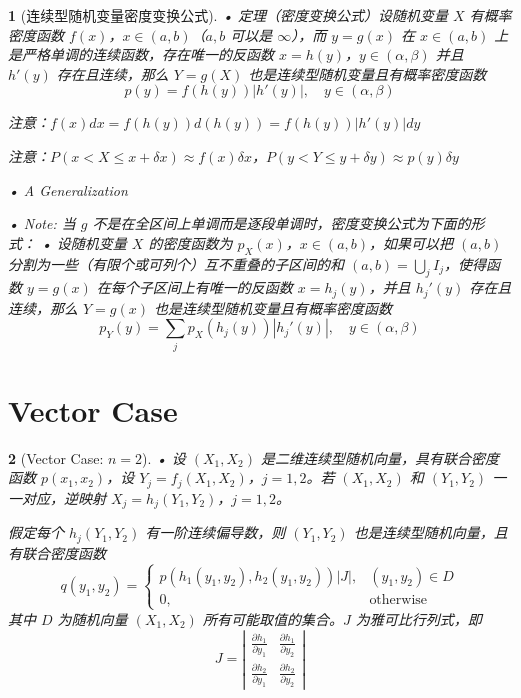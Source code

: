 \documentclass[UTF8]{report}
\theoremstyle{MyLineTheoremStyle} %
\theoremstyle{MyBlockTheoremStyle} %
\theoremstyle{MySubsubsectionStyle} %
\newtheorem{definition}{}
\begin{document}
\begin{definition}[连续型随机变量密度变换公式]
    • 定理（密度变换公式）设随机变量 $X$ 有概率密度函数 $f(x)$，$x \in (a,b)$（$a,b$ 可以是 $\infty$），而 $y=g(x)$ 在 $x \in (a,b)$ 上是严格单调的连续函数，存在唯一的反函数 $x=h(y)$，$y \in (\alpha,\beta)$ 并且 $h'(y)$ 存在且连续，那么 $Y=g(X)$ 也是连续型随机变量且有概率密度函数
    \[
    p(y) = f(h(y)) \left|h'(y)\right| , \quad y \in (\alpha, \beta)
    \]\par
    注意：$f(x)dx = f(h(y))d(h(y)) = f(h(y))\left|h'(y)\right|dy$
    \par
    注意：$P(x < X \leq x+\delta x) \approx f(x) \delta x$，$P(y < Y \leq y+\delta y) \approx p(y) \delta y$\par
    • A Generalization\par
    • Note: 当 $g$ 不是在全区间上单调而是逐段单调时，密度变换公式为下面的形式：
    • 设随机变量 $X$ 的密度函数为 $p_X(x)$，$x \in (a,b)$，如果可以把 $(a,b)$ 分割为一些（有限个或可列个）互不重叠的子区间的和 $(a,b)=\bigcup_j I_j$，使得函数 $y = g(x)$ 在每个子区间上有唯一的反函数 $x = h_j(y)$，并且 $h_j'(y)$ 存在且连续，那么 $Y = g(x)$ 也是连续型随机变量且有概率密度函数
    \[
    p_Y(y) = \sum_{j} p_X(h_j(y)) \left|h_j'(y)\right| , \quad y \in (\alpha, \beta)
    \]
\end{definition}

\section{Vector Case}

\begin{definition}[Vector Case: $n = 2$]
    • 设 $(X_1, X_2)$ 是二维连续型随机向量，具有联合密度函数 $p(x_1, x_2)$，设 $Y_j = f_j(X_1, X_2)$，$j=1,2$。若 $(X_1, X_2)$ 和 $(Y_1, Y_2)$ 一一对应，逆映射 $X_j = h_j(Y_1, Y_2)$，$j=1,2$。\par
    假定每个 $h_j(Y_1, Y_2)$ 有一阶连续偏导数，则 $(Y_1, Y_2)$ 也是连续型随机向量，且有联合密度函数
    \[
    q(y_1, y_2) =
    \begin{cases}
         p(h_1(y_1, y_2), h_2(y_1, y_2)) \left| J \right|, & (y_1, y_2) \in D \\
         0, & \text{otherwise}
    \end{cases}
    \]
    其中 $D$ 为随机向量 $(X_1, X_2)$ 所有可能取值的集合。$J$ 为雅可比行列式，即
    \[
    J = \left|
    \begin{array}{cc}
        \frac{\partial h_1}{\partial y_1} & \frac{\partial h_1}{\partial y_2} \\
        \frac{\partial h_2}{\partial y_1} & \frac{\partial h_2}{\partial y_2}
    \end{array}
    \right|
    \]
\end{definition}
\end{document}
